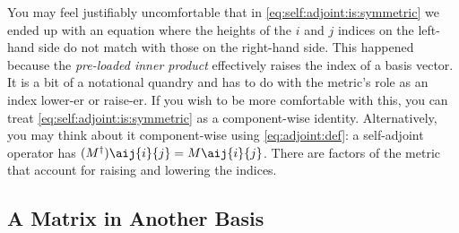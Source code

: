 You may feel justifiably uncomfortable that in \eqref{eq:self:adjoint:is:symmetric} we ended up with an equation where the heights of the $i$ and $j$ indices on the left-hand side do not match with those on the right-hand side. This happened because the \emph{pre-loaded inner product} effectively raises the index of a basis vector. It is a bit of a notational quandry and has to do with the metric's role as an index lower-er or raise-er. If you wish to be more comfortable with this, you can treat \eqref{eq:self:adjoint:is:symmetric} as a component-wise identity. Alternatively, you may think about it component-wise using \eqref{eq:adjoint:def}: a self-adjoint operator has $(M^\dag)\aij{i}{j} = M\aij{i}{j}$. There are factors of the metric that account for raising and lowering the indices.


\begin{subappendices}

\section{A Matrix in Another Basis}


\end{subappendices}
